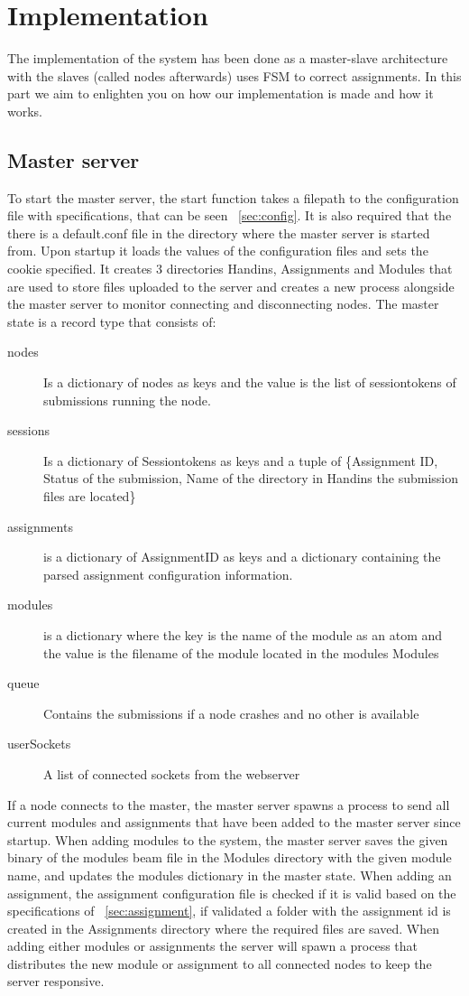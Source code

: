 \chapter{Implementation}
The implementation of the system has been done as a master-slave architecture
with the slaves (called nodes afterwards) uses FSM to correct assignments.
In this part we aim to enlighten you on how our implementation is made and how
it works.

\section{Master server}
To start the master server, the start function takes a filepath to the configuration file with specifications, that can be seen ~\ref{sec:config}. It is also required that the there is a default.conf file in the directory where the master server is started from. Upon startup it loads the values of the configuration files and sets the cookie specified. It creates 3 directories Handins, Assignments and Modules that are used to store files uploaded to the server and creates a new process alongside the master server to monitor connecting and disconnecting nodes. The master state is a record type that consists of:
\begin{description}
    \item[nodes] Is a dictionary of nodes as keys and the value is the list of sessiontokens of submissions running the node.
\item [sessions] Is a dictionary of Sessiontokens as keys and a tuple of \{Assignment ID, Status of the submission, Name of the directory in Handins the submission files are located\}
\item [assignments]  is a dictionary of AssignmentID as keys and a dictionary containing the parsed assignment configuration information.
\item [modules]  is a dictionary where the key is the name of the module as an atom and the value is the filename of the module located in the modules Modules
\item [queue] Contains the submissions if a node crashes and no other is available
\item [userSockets] A list of connected sockets from the webserver
\end{description}
If a node connects to the master, the master server spawns a process to send all current modules and assignments that have been added to the master server since startup. When adding modules to the system, the master server saves the given binary of the modules beam file in the Modules directory with the given module name, and updates the modules dictionary in the master state. When adding an assignment, the assignment configuration file is checked if it is valid based on the specifications of ~\ref{sec:assignment}, if validated a folder with the assignment id is created in the Assignments directory where the required files are saved. When adding either modules or assignments the server will spawn a process that distributes the new module or assignment to all connected nodes to keep the server responsive.


